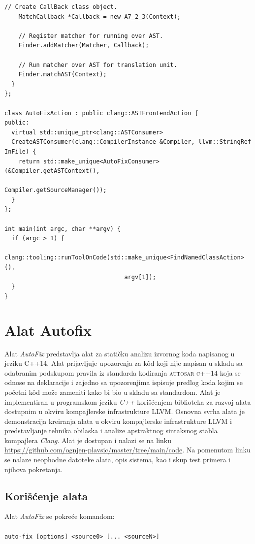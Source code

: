 \documentclass[12pt,oneside]{memoir}
\begin{document}
\begin{lstlisting}[style=customc,  caption={Primer implementacije jednostavnog alata upotrebom interfejsa \texttt{ASTConsumer}, \texttt{ASTFrontendAction} i bibliotekom \texttt{libtooling}.}, label=lst:label9]
    // Create CallBack class object.
    MatchCallback *Callback = new A7_2_3(Context);

    // Register matcher for running over AST.
    Finder.addMatcher(Matcher, Callback);

    // Run matcher over AST for translation unit.
    Finder.matchAST(Context);
  }
};

class AutoFixAction : public clang::ASTFrontendAction {
public:
  virtual std::unique_ptr<clang::ASTConsumer>
  CreateASTConsumer(clang::CompilerInstance &Compiler, llvm::StringRef InFile) {
    return std::make_unique<AutoFixConsumer>(&Compiler.getASTContext(),
                                             Compiler.getSourceManager());
  }
};

int main(int argc, char **argv) {
  if (argc > 1) {
    clang::tooling::runToolOnCode(std::make_unique<FindNamedClassAction>(),
                                  argv[1]);
  }
}
\end{lstlisting}


\chapter{Alat Autofix}
\label{chp:autofix}

Alat \textit{AutoFix} predstavlja alat za stati\v{c}ku analizu izvornog koda napisanog u jeziku C++14. Alat prijavljuje upozorenja
za k\^{o}d koji nije napisan u skladu sa odabranim podskupom pravila iz standarda kodiranja \textsc{autosar c++14} koja se odnose na deklaracije i zajedno sa upozorenjima
ispisuje predlog koda kojim se po\v{c}etni k\^{o}d mo\v{z}e zameniti kako bi bio u skladu sa standardom.
Alat je implementiran u programskom jeziku \textit{C++} kori\v{s}\'{c}enjem biblioteka za razvoj alata dostupnim u okviru kompajlerske infrastrukture LLVM.
Osnovna svrha alata je demonstracija kreiranja alata u okviru kompajlerske infrastrukture LLVM i predstavljanje tehnika obilaska i analize apstraktnog sintaksnog stabla kompajlera \textit{Clang}. 
Alat je dostupan i nalazi se na linku \url{https://github.com/ognjen-plavsic/master/tree/main/code}. Na pomenutom linku se nalaze neophodne datoteke alata, opis
sistema, kao i skup test primera i njihova pokretanja.

\section{Kori\v{s}\'{c}enje alata}

Alat \textit{AutoFix} se pokre\'{c}e komandom:
\\ \\
 \indent \indent \texttt{auto-fix [options] <source0> [... <sourceN>]}
\\ 
\end{document}
